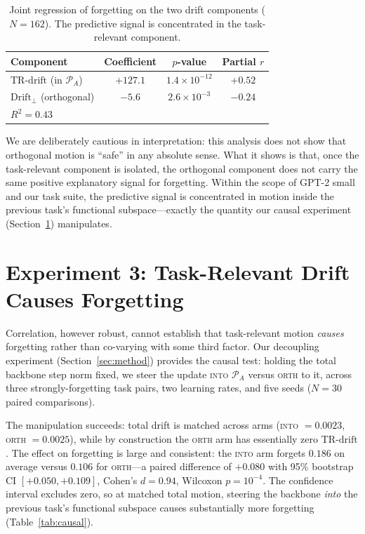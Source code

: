 \documentclass[11pt]{article}
\newcommand{\trdrift}{\mathrm{TR\text{-}drift}}
\newcommand{\PA}{\mathcal{P}_A}
\begin{document}
\begin{table}[t]
\centering
\caption{Joint regression of forgetting on the two drift components ($N=162$).
The predictive signal is concentrated in the task-relevant component.}
\label{tab:decomp}
\begin{tabular}{lccc}
\toprule
Component & Coefficient & $p$-value & Partial $r$ \\
\midrule
$\trdrift$ (in $\PA$)               & $+127.1$ & $1.4\times10^{-12}$ & $+0.52$ \\
$\mathrm{Drift}_{\perp}$ (orthogonal) & $-5.6$  & $2.6\times10^{-3}$  & $-0.24$ \\
\midrule
\multicolumn{4}{l}{$R^2 = 0.43$} \\
\bottomrule
\end{tabular}
\end{table}

We are deliberately cautious in interpretation: this analysis does not show that
orthogonal motion is ``safe'' in any absolute sense. What it shows is that,
once the task-relevant component is isolated, the orthogonal component does not
carry the same positive explanatory signal for forgetting. Within the scope of
GPT-2 small and our task suite, the predictive signal is concentrated in motion
inside the previous task's functional subspace---exactly the quantity our causal
experiment (Section~\ref{sec:causal}) manipulates.

\section{Experiment 3: Task-Relevant Drift Causes Forgetting}
\label{sec:causal}

Correlation, however robust, cannot establish that task-relevant motion
\emph{causes} forgetting rather than co-varying with some third factor. Our
decoupling experiment (Section~\ref{sec:method}) provides the causal test:
holding the total backbone step norm fixed, we steer the update \textsc{into}
$\PA$ versus \textsc{orth} to it, across three strongly-forgetting task pairs,
two learning rates, and five seeds ($N=30$ paired comparisons).

The manipulation succeeds: total drift is matched across arms
(\textsc{into} $=0.0023$, \textsc{orth} $=0.0025$), while by construction the
\textsc{orth} arm has essentially zero $\trdrift$. The effect on forgetting is
large and consistent: the \textsc{into} arm forgets $0.186$ on average versus
$0.106$ for \textsc{orth}---a paired difference of $+0.080$ with 95\% bootstrap
CI $[+0.050, +0.109]$, Cohen's $d=0.94$, Wilcoxon $p=10^{-4}$. The confidence
interval excludes zero, so at matched total motion, steering the backbone
\emph{into} the previous task's functional subspace causes substantially more
forgetting (Table~\ref{tab:causal}).
\end{document}
